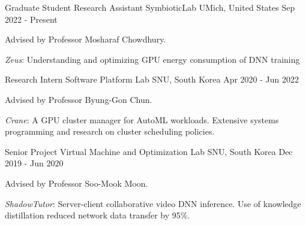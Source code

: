 

\begin{cventries}

  \cventry
    {Graduate Student Research Assistant} %
    {SymbioticLab} %
    {UMich, United States} %
    {Sep 2022 - Present} %
    {
      \begin{cvitems} %
        \item {Advised by Professor Mosharaf Chowdhury.}
        \item {\textit{Zeus}: Understanding and optimizing GPU energy consumption of DNN training}
      \end{cvitems}
    }
    
  \cventry
    {Research Intern} %
    {Software Platform Lab} %
    {SNU, South Korea} %
    {Apr 2020 - Jun 2022} %
    {
      \begin{cvitems} %
        \item {Advised by Professor Byung-Gon Chun.}
        \item {\textit{Crane}: A GPU cluster manager for AutoML workloads. Extensive systems programming and research on cluster scheduling policies.}
      \end{cvitems}
    }
    
  \cventry
    {Senior Project} %
    {Virtual Machine and Optimization Lab} %
    {SNU, South Korea} %
    {Dec 2019 - Jun 2020} %
    {
      \begin{cvitems} %
        \item {Advised by Professor Soo-Mook Moon.}
        \item {\textit{ShadowTutor}: Server-client collaborative video DNN inference. Use of knowledge distillation reduced network data transfer by 95\%.}
      \end{cvitems}
    }
    

\end{cventries}

